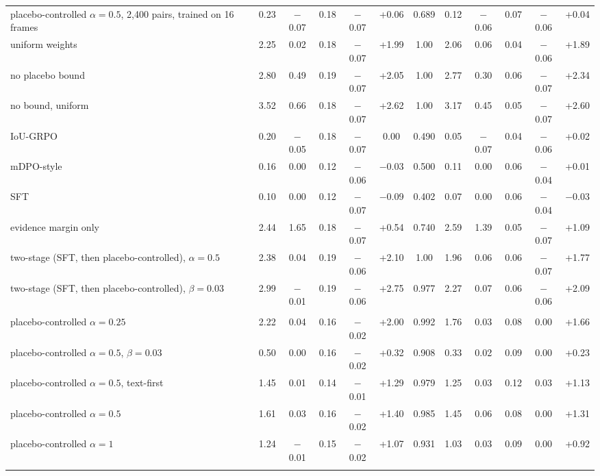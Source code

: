 \begin{table}[tbp]
\begin{tabular}{@{}>{\raggedright\arraybackslash}p{4.1cm}cccccc@{\hspace{8pt}}ccccc@{}}
placebo-controlled $\alpha{=}0.5$, 2,400 pairs, trained on 16 frames & 0.23 & $-$0.07 & 0.18 & $-$0.07 & +0.06 & 0.689 & 0.12 & $-$0.06 & 0.07 & $-$0.06 & +0.04 \\
uniform weights & 2.25 & 0.02 & 0.18 & $-$0.07 & +1.99 & 1.00 & 2.06 & 0.06 & 0.04 & $-$0.06 & +1.89 \\
no placebo bound & 2.80 & 0.49 & 0.19 & $-$0.07 & +2.05 & 1.00 & 2.77 & 0.30 & 0.06 & $-$0.07 & +2.34 \\
no bound, uniform & 3.52 & 0.66 & 0.18 & $-$0.07 & +2.62 & 1.00 & 3.17 & 0.45 & 0.05 & $-$0.07 & +2.60 \\
IoU-GRPO & 0.20 & $-$0.05 & 0.18 & $-$0.07 & 0.00 & 0.490 & 0.05 & $-$0.07 & 0.04 & $-$0.06 & +0.02 \\
mDPO-style & 0.16 & 0.00 & 0.12 & $-$0.06 & $-$0.03 & 0.500 & 0.11 & 0.00 & 0.06 & $-$0.04 & +0.01 \\
SFT & 0.10 & 0.00 & 0.12 & $-$0.07 & $-$0.09 & 0.402 & 0.07 & 0.00 & 0.06 & $-$0.04 & $-$0.03 \\
evidence margin only & 2.44 & 1.65 & 0.18 & $-$0.07 & +0.54 & 0.740 & 2.59 & 1.39 & 0.05 & $-$0.07 & +1.09 \\
two-stage (SFT, then placebo-controlled), $\alpha{=}0.5$ & 2.38 & 0.04 & 0.19 & $-$0.06 & +2.10 & 1.00 & 1.96 & 0.06 & 0.06 & $-$0.07 & +1.77 \\
two-stage (SFT, then placebo-controlled), $\beta{=}0.03$ & 2.99 & $-$0.01 & 0.19 & $-$0.06 & +2.75 & 0.977 & 2.27 & 0.07 & 0.06 & $-$0.06 & +2.09 \\
\addlinespace[1pt]\multicolumn{12}{@{}l}{\textit{TimeZero}} \\
placebo-controlled $\alpha{=}0.25$ & 2.22 & 0.04 & 0.16 & $-$0.02 & +2.00 & 0.992 & 1.76 & 0.03 & 0.08 & 0.00 & +1.66 \\
placebo-controlled $\alpha{=}0.5$, $\beta{=}0.03$ & 0.50 & 0.00 & 0.16 & $-$0.02 & +0.32 & 0.908 & 0.33 & 0.02 & 0.09 & 0.00 & +0.23 \\
placebo-controlled $\alpha{=}0.5$, text-first & 1.45 & 0.01 & 0.14 & $-$0.01 & +1.29 & 0.979 & 1.25 & 0.03 & 0.12 & 0.03 & +1.13 \\
placebo-controlled $\alpha{=}0.5$ & 1.61 & 0.03 & 0.16 & $-$0.02 & +1.40 & 0.985 & 1.45 & 0.06 & 0.08 & 0.00 & +1.31 \\
placebo-controlled $\alpha{=}1$ & 1.24 & $-$0.01 & 0.15 & $-$0.02 & +1.07 & 0.931 & 1.03 & 0.03 & 0.09 & 0.00 & +0.92 \\
\addlinespace[1pt]\multicolumn{12}{@{}l}{\textit{Time-R1}} \\

\end{tabular}
\end{table}
